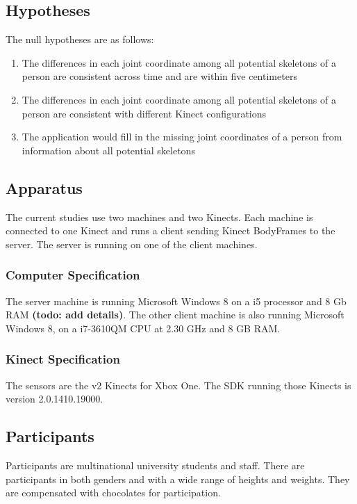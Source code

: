 \documentclass{sigchi}
\begin{document}
\subsection{Hypotheses}

The null hypotheses are as follows:

\begin{enumerate}
  \item The differences in each joint coordinate among all potential skeletons of a person are consistent across time and are within five centimeters
  \item The differences in each joint coordinate among all potential skeletons of a person are consistent with different Kinect configurations
  \item The application would fill in the missing joint coordinates of a person from information about all potential skeletons
\end{enumerate}

\subsection{Apparatus}

The current studies use two machines and two Kinects. Each machine is connected to one Kinect and runs a client sending Kinect BodyFrames to the server. The server is running on one of the client machines.

\subsubsection{Computer Specification}

The server machine is running Microsoft Windows 8 on a i5 processor and 8 Gb RAM \textbf{(todo: add details)}. The other client machine is also running Microsoft Windows 8, on a i7-3610QM CPU at 2.30 GHz and 8 GB RAM.

\subsubsection{Kinect Specification}

The sensors are the v2 Kinects for Xbox One. The SDK running those Kinects is version 2.0.1410.19000.

\subsection{Participants}

Participants are multinational university students and staff. There are participants in both genders and with a wide range of heights and weights. They are compensated with chocolates for participation.
\end{document}
